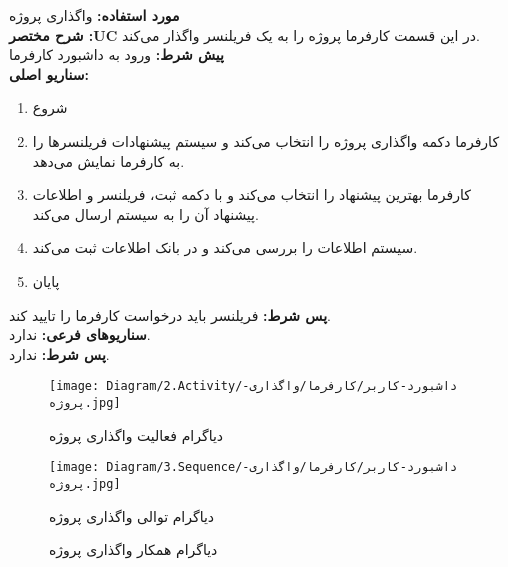 \textbf{مورد استفاده:}
واگذاری پروژه
\\
\textbf{شرح مختصر :UC}
در این قسمت کارفرما پروژه را به یک فریلنسر واگذار می‌کند.
\\
\textbf{پيش شرط:}
ورود به داشبورد کارفرما
\\
\textbf{سناريو اصلی:}
\begin{enumerate}
\item
شروع
\item
کارفرما دکمه واگذاری پروژه را انتخاب می‌کند و سیستم پیشنهادات فریلنسرها را به کارفرما نمایش می‌دهد.
\item
کارفرما بهترین پیشنهاد را انتخاب می‌کند و با دکمه ثبت، فریلنسر و اطلاعات پیشنهاد آن را به سیستم ارسال می‌کند.
\item
سیستم اطلاعات را بررسی می‌کند و در بانک اطلاعات ثبت می‌کند.
\item
پایان
\end{enumerate}

\noindent
\textbf{پس شرط:}
فریلنسر باید درخواست کارفرما را تایید کند.
\\
\textbf{سناريوهای فرعی:}
ندارد.
\\
\textbf{پس شرط:}
ندارد.



\begin{figure}[H]
	\centering
	\texttt{[image: Diagram/2.Activity/داشبورد-کاربر/کارفرما/واگذاری-پروژه.jpg]}
	\caption{دیاگرام فعالیت واگذاری پروژه}
	\label{fig:a:واگذاری-پروژه}
\end{figure}
\begin{figure}[H]
	\centering
	\texttt{[image: Diagram/3.Sequence/داشبورد-کاربر/کارفرما/واگذاری-پروژه.jpg]}
	\caption{دیاگرام توالی واگذاری پروژه}
	\label{fig:s:واگذاری-پروژه}
\end{figure}
\begin{figure}[H]
\centering
\caption{دیاگرام همکار واگذاری پروژه}
\label{fig:c:واگذاری-پروژه}
\end{figure}
